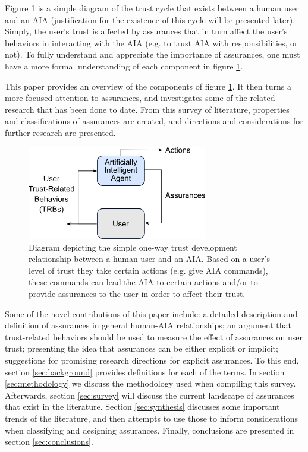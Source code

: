     Figure \ref{fig:SimpleTrust_one_way} is a simple diagram of the trust cycle that exists between a human user and an AIA (justification for the existence of this cycle will be presented later). Simply, the user's trust is affected by assurances that in turn affect the user's behaviors in interacting with the AIA (e.g. to trust AIA with responsibilities, or not). To fully understand and appreciate the importance of assurances, one must have a more formal understanding of each component in figure \ref{fig:SimpleTrust_one_way}.

    This paper provides an overview of the components of figure \ref{fig:SimpleTrust_one_way}. It then turns a more focused attention to assurances, and investigates some of the related research that has been done to date. From this survey of literature, properties and classifications of assurances are created, and directions and considerations for further research are presented.

    \begin{figure}
        \centering
        \includegraphics[width=0.7\textwidth]{Figures/SimpleTrust_one_way.png}
        \caption{Diagram depicting the simple one-way trust development relationship between a human user and an AIA. Based on a user's level of trust they take certain actions (e.g. give AIA commands), these commands can lead the AIA to certain actions and/or to provide assurances to the user in order to affect their trust.}
        \label{fig:SimpleTrust_one_way}
    \end{figure}

    Some of the novel contributions of this paper include: a detailed description and definition of assurances in general human-AIA relationships; an argument that trust-related behaviors should be used to measure the effect of assurances on user trust; presenting the idea that assurances can be either explicit or implicit; suggestions for promising research directions for explicit assurances. To this end, section \ref{sec:background} provides definitions for each of the terms. In section \ref{sec:methodology} we discuss the methodology used when compiling this survey. Afterwards, section \ref{sec:survey} will discuss the current landscape of assurances that exist in the literature. Section \ref{sec:synthesis} discusses some important trends of the literature, and then attempts to use those to inform considerations when classifying and designing assurances. Finally, conclusions are presented in section \ref{sec:conclusions}.
